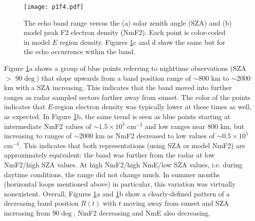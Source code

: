 \begin{figure}
\texttt{[image: p1f4.pdf]}
\caption{The echo band range versus the (a) solar zenith angle (SZA) and (b) model peak F2 electron density (NmF2). Each point is color-coded in model \(E\) region density. Figures \ref{fig:scatter}c and d show the same but for the  echo occurrence within the band.}
\label{fig:scatter}
\end{figure}

Figure \ref{fig:scatter}a shows a group of blue points referring to nighttime observations (SZA \(>\) 90\(\deg\)) that slope upwards from a band position range of \(\sim\)800 km to \(\sim\)2000 km with a SZA increasing. This indicates that the band moved into further ranges as radar sampled sectors farther away from sunset. The color of the points indicates that \(E\)-region electron density was typically lower at these times as well, as expected. In Figure \ref{fig:scatter}b, the same trend is seen as blue points starting at intermediate NmF2 values of \(\sim1.5 \times 10^5\) cm\(^{-3}\) and low ranges near 800 km, but increasing to ranges of \(\sim\)2000 km as NmF2 decreased to low values of \(\sim0.5 \times 10^5\) cm\(^{-3}\). This indicates that both representations (using SZA or model NmF2) are approximately equivalent: the band was further from the radar at low NmF2/high SZA values. At high NmF2/high NmE/low SZA values, i.e. during daytime conditions, the range did not change much. In summer months (horizontal loops mentioned above) in particular, this variation was virtually nonexistent. Overall, Figures \ref{fig:scatter}a and \ref{fig:scatter}b show a clearly-defined pattern of a decreasing band position \(R\left(t\right)\) with \(t\) moving away from sunset and SZA increasing from 90\(\deg\), NmF2 decreasing and NmE also decreasing.

